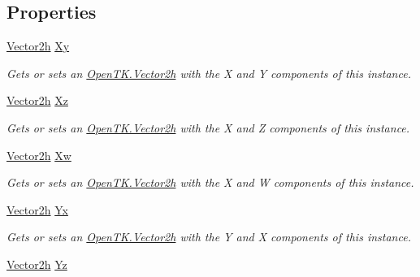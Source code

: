 \subsection*{Properties}
\begin{DoxyCompactItemize}
\item 
\hyperlink{struct_open_t_k_1_1_vector2h}{Vector2h} \hyperlink{struct_open_t_k_1_1_vector4h_a1661594d8cb9fb720a0beab03d931b07}{Xy}
\begin{DoxyCompactList}\small\item\em Gets or sets an \hyperlink{struct_open_t_k_1_1_vector2h}{Open\-T\-K.\-Vector2h} with the X and Y components of this instance. \end{DoxyCompactList}\item 
\hyperlink{struct_open_t_k_1_1_vector2h}{Vector2h} \hyperlink{struct_open_t_k_1_1_vector4h_abc0270e51e46476bc96dfe59aecdd8fd}{Xz}
\begin{DoxyCompactList}\small\item\em Gets or sets an \hyperlink{struct_open_t_k_1_1_vector2h}{Open\-T\-K.\-Vector2h} with the X and Z components of this instance. \end{DoxyCompactList}\item 
\hyperlink{struct_open_t_k_1_1_vector2h}{Vector2h} \hyperlink{struct_open_t_k_1_1_vector4h_a1fbc241901d7335f761da708abc92cd2}{Xw}
\begin{DoxyCompactList}\small\item\em Gets or sets an \hyperlink{struct_open_t_k_1_1_vector2h}{Open\-T\-K.\-Vector2h} with the X and W components of this instance. \end{DoxyCompactList}\item 
\hyperlink{struct_open_t_k_1_1_vector2h}{Vector2h} \hyperlink{struct_open_t_k_1_1_vector4h_a20678ddeb822b11239ca112683c9e8a0}{Yx}
\begin{DoxyCompactList}\small\item\em Gets or sets an \hyperlink{struct_open_t_k_1_1_vector2h}{Open\-T\-K.\-Vector2h} with the Y and X components of this instance. \end{DoxyCompactList}\item 
\hyperlink{struct_open_t_k_1_1_vector2h}{Vector2h} \hyperlink{struct_open_t_k_1_1_vector4h_a9a87c6d679af481e4cd49f651808a506}{Yz}

\end{DoxyCompactItemize}
